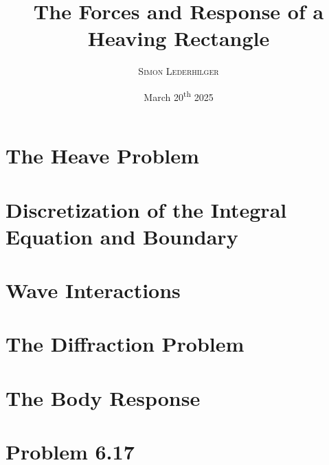 \documentclass{article}
\title{The Forces and Response of a Heaving Rectangle}
\subtitle{\emph{\headcourse}}
\author{\textsc{Simon Lederhilger}}
\date{March 20\textsuperscript{th} 2025}
\begin{document}
\maketitle\thispagestyle{fancy}
    \begin{multicols*}{2}
        \section[Heave]{The Heave Problem}
        

        \section[Discretizations]{Discretization of the Integral Equation and Boundary}
        

        \section[Waves]{Wave Interactions}
        

        \section[Diffraction]{The Diffraction Problem}
        

        \section[Response]{The Body Response}
        
    \end{multicols*}
    
    \section{Problem 6.17}
    
    \newline\vspace{2mm}
    
\end{document}
